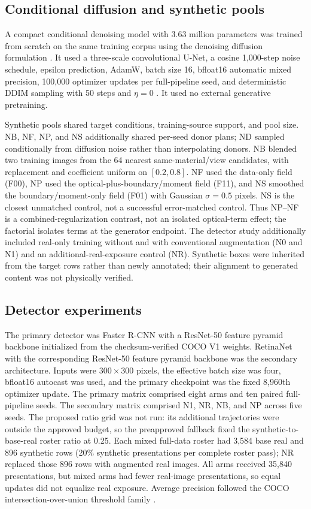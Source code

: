 \documentclass[11pt]{article}
\begin{document}
\subsection{Conditional diffusion and synthetic pools}
A compact conditional denoising model with 3.63 million parameters was trained from scratch on the same training corpus using the denoising diffusion formulation \citep{ho2020}. It used a three-scale convolutional U-Net, a cosine 1,000-step noise schedule, epsilon prediction, AdamW, batch size 16, bfloat16 automatic mixed precision, 100,000 optimizer updates per full-pipeline seed, and deterministic DDIM sampling with 50 steps and $\eta=0$ \citep{song2021}. It used no external generative pretraining.

Synthetic pools shared target conditions, training-source support, and pool size. NB, NF, NP, and NS additionally shared per-seed donor plans; ND sampled conditionally from diffusion noise rather than interpolating donors. NB blended two training images from the 64 nearest same-material/view candidates, with replacement and coefficient uniform on $[0.2,0.8]$. NF used the data-only field (F00), NP used the optical-plus-boundary/moment field (F11), and NS smoothed the boundary/moment-only field (F01) with Gaussian $\sigma=0.5$ pixels. NS is the closest unmatched control, not a successful error-matched control. Thus NP--NF is a combined-regularization contrast, not an isolated optical-term effect; the factorial isolates terms at the generator endpoint. The detector study additionally included real-only training without and with conventional augmentation (N0 and N1) and an additional-real-exposure control (NR). Synthetic boxes were inherited from the target rows rather than newly annotated; their alignment to generated content was not physically verified.

\subsection{Detector experiments}
The primary detector was Faster R-CNN \citep{ren2015} with a ResNet-50 feature pyramid backbone initialized from the checksum-verified COCO V1 weights. RetinaNet \citep{lin2017focal} with the corresponding ResNet-50 feature pyramid backbone was the secondary architecture. Inputs were $300\times300$ pixels, the effective batch size was four, bfloat16 autocast was used, and the primary checkpoint was the fixed 8,960th optimizer update. The primary matrix comprised eight arms and ten paired full-pipeline seeds. The secondary matrix comprised N1, NR, NB, and NP across five seeds. The proposed ratio grid was not run: its additional trajectories were outside the approved budget, so the preapproved fallback fixed the synthetic-to-base-real roster ratio at 0.25. Each mixed full-data roster had 3,584 base real and 896 synthetic rows (20\% synthetic presentations per complete roster pass); NR replaced those 896 rows with augmented real images. All arms received 35,840 presentations, but mixed arms had fewer real-image presentations, so equal updates did not equalize real exposure. Average precision followed the COCO intersection-over-union threshold family \citep{lin2014coco}.
\end{document}
